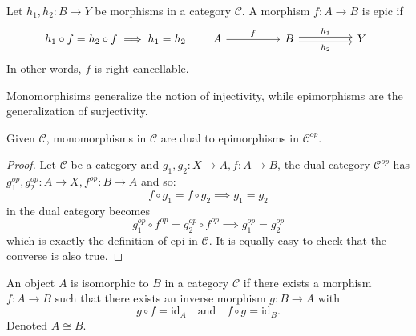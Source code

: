\begin{definition}
  \label{def:epimorphism}
  Let \( h_1, h_2 : B \to Y \) be morphisms in a category \(\mathcal{C}\).  
  A morphism \( f : A \to B \) is epic if
  \[
    h_1 \circ f = h_2 \circ f \implies h_1 = h_2
    \qquad
      \begin{tikzcd}[row sep=huge, column sep=huge]
            A \arrow[r, "f"] & B \arrow[r, shift left=0.5ex, "h_1"] 
      \arrow[r, shift right=0.5ex, swap, "h_2"] & Y
    \end{tikzcd}
  \]
  In other words, \(f\) is right-cancellable.
\end{definition}

\begin{note}
  Monomorphisims generalize the notion of injectivity, while epimorphisms are the generalization of surjectivity.
\end{note}

\begin{proposition} Given $\mathcal{C}$, monomorphisms in $\mathcal{C}$ are dual to epimorphisms in $\mathcal{C}^{op}$.

  \begin{proof}
    Let $\mathcal{C}$ be a category and $ g_1, g_2 : X \to A, f : A \to B$, the dual category $\mathcal{C}^{op}$ has $g_1^{op}, g_2^{op} : A \to X, f^{op} : B \to A $ and so:
    \[
      f \circ g_1 = f \circ g_2 \implies g_1 = g_2
    \]
    in the dual category becomes
    \[
      g_1^{op} \circ f^{op} = g_2^{op} \circ f^{op} \implies g_1^{op} = g_2^{op}
    \]
    which is exactly the definition of epi in $\mathcal{C}$. It is equally easy to check that the converse is also true.
  \end{proof}
\end{proposition}

\begin{definition}
  An object \(A\) is isomorphic to \(B\) in a category \(\mathcal{C}\) if there exists a morphism
  \(
  f: A \to B
  \)
  such that there exists an inverse morphism
  \( g: B \to A \)
  with
  \[
    g \circ f = \mathrm{id}_A \quad \text{and} \quad f \circ g = \mathrm{id}_B.
  \]
  Denoted \(A \cong B\).
\end{definition}


